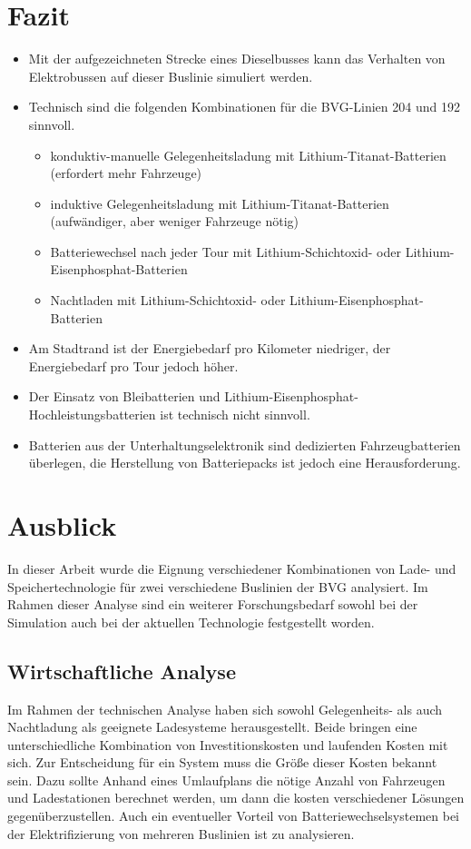 \section{Fazit}
\begin{itemize}
	\item Mit der aufgezeichneten Strecke eines Dieselbusses kann das Verhalten von Elektrobussen auf dieser Buslinie simuliert werden.
	\item Technisch sind die folgenden Kombinationen für die BVG-Linien 204 und 192 sinnvoll.
	\begin{itemize}
		\item konduktiv-manuelle Gelegenheitsladung mit Lithium-Titanat-Batterien (erfordert mehr Fahrzeuge)
		\item induktive Gelegenheitsladung mit Lithium-Titanat-Batterien (aufwändiger, aber weniger Fahrzeuge nötig)
		\item Batteriewechsel nach jeder Tour mit Lithium-Schichtoxid- oder Lithium-Eisenphosphat-Batterien
		\item Nachtladen mit Lithium-Schichtoxid- oder Lithium-Eisenphosphat-Batterien
	\end{itemize}
	\item Am Stadtrand ist der Energiebedarf pro Kilometer niedriger, der Energiebedarf pro Tour jedoch höher.
	\item Der Einsatz von Bleibatterien und Lithium-Eisenphosphat-Hochleistungsbatterien ist technisch nicht sinnvoll.
	\item Batterien aus der Unterhaltungselektronik sind dedizierten Fahrzeugbatterien überlegen, die Herstellung von Batteriepacks ist jedoch eine Herausforderung.
\end{itemize}

\section{Ausblick}
In dieser Arbeit wurde die Eignung verschiedener Kombinationen von Lade- und Speichertechnologie für zwei verschiedene Buslinien der BVG analysiert. Im Rahmen dieser Analyse sind ein weiterer Forschungsbedarf sowohl bei der Simulation auch bei der aktuellen Technologie festgestellt worden.

\subsection{Wirtschaftliche Analyse}
Im Rahmen der technischen Analyse haben sich sowohl Gelegenheits- als auch Nachtladung als geeignete Ladesysteme herausgestellt. Beide bringen eine unterschiedliche Kombination von Investitionskosten und laufenden Kosten mit sich. Zur Entscheidung für ein System muss die Größe dieser Kosten bekannt sein. Dazu sollte Anhand eines Umlaufplans die nötige Anzahl von Fahrzeugen und Ladestationen berechnet werden, um dann die kosten verschiedener Lösungen gegenüberzustellen. Auch ein eventueller Vorteil von Batteriewechselsystemen bei der Elektrifizierung von mehreren Buslinien ist zu analysieren.

